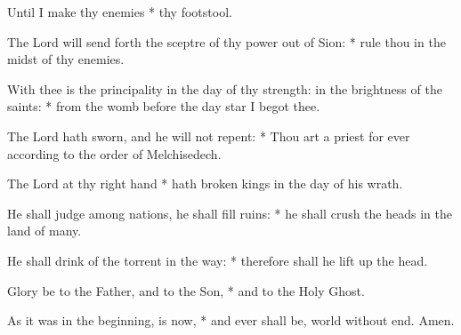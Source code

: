 ﻿\item Until I make thy enemies * thy footstool.
\item The Lord will send forth the sceptre of thy power out of Sion: * rule thou in the midst of thy enemies.
\item With thee is the principality in the day of thy strength: in the brightness of the saints: * from the womb before the day star I begot thee.
\item  The Lord hath sworn, and he will not repent: * Thou art a priest for ever according to the order of Melchisedech.
\item  The Lord at thy right hand * hath broken kings in the day of his wrath.
\item  He shall judge among nations, he shall fill ruins: * he shall crush the heads in the land of many.
\item  He shall drink of the torrent in the way: * therefore shall he lift up the head.
\item  Glory be to the Father, and to the Son, * and to the Holy Ghost.
\item  As it was in the beginning, is now, * and ever shall be, world without end. Amen.
